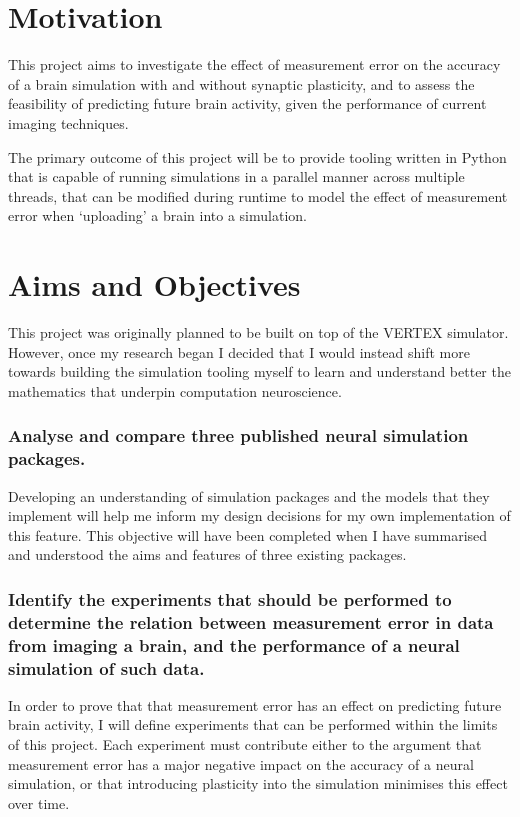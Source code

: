\section{Motivation}

This project aims to investigate the effect of measurement error on the accuracy
of a brain simulation with and without synaptic plasticity, and to assess the
feasibility of predicting future brain activity, given the performance of
current imaging techniques.

The primary outcome of this project will be to provide tooling written in Python
that is capable of running simulations in a parallel manner across multiple
threads, that can be modified during runtime to model the effect of measurement
error when `uploading' a brain into a simulation.

\section{Aims and Objectives}

This project was originally planned to be built on top of the VERTEX simulator.
However, once my research began I decided that I would instead shift more
towards building the simulation tooling myself to learn and understand better
the mathematics that underpin computation neuroscience.

\subsubsection{Analyse and compare three published neural simulation packages.}

Developing an understanding of simulation packages and the models that they
implement will help me inform my design decisions for my own implementation of
this feature. This objective will have been completed when I have summarised and
understood the aims and features of three existing packages.


\subsubsection{Identify the experiments that should be performed to determine
      the relation between measurement error in data from imaging a brain, and the
      performance of a neural simulation of such data.}

In order to prove that that
measurement error has an effect on predicting future brain activity, I will
define experiments that can be performed within the limits of this project. Each
experiment must contribute either to the argument that measurement error has a
major negative impact on the accuracy of a neural simulation, or that
introducing plasticity into the simulation minimises this effect over time.


